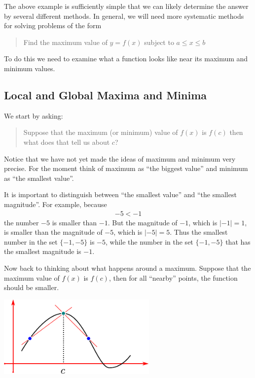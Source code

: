 The above example is sufficiently simple that we can likely determine the answer by
several different methods. In general, we will need more systematic methods for solving
problems of the form
\begin{quote}
 Find the maximum value of $y = f(x)$ subject to $a \leq x \leq b$
\end{quote}
To do this we need to examine what a function looks like near its
maximum and minimum values.

\subsection{Local and Global Maxima and Minima}\label{ssec maxmin}
We start by asking:
\begin{quote}
Suppose that the maximum (or minimum) value of $f(x)$ is $f(c)$ then what does that tell
us about $c$?
\end{quote}
Notice that we have not yet made the ideas of maximum and minimum very precise.
For the moment think of maximum as ``the biggest value'' and minimum as
``the smallest value''.

\begin{warning}
It is important to distinguish between ``the smallest value'' and ``the smallest
magnitude''. For example, because
\begin{align*}
  -5 < -1
\end{align*}
the number $-5$ is smaller than $-1$. But the magnitude of $-1$, which is $|-1|=1$, is
smaller than the magnitude of $-5$, which is $|-5|=5$. Thus the smallest number in the set
$\{-1, -5\}$ is $-5$, while the number in the set $\{-1,-5\}$ that has the smallest
magnitude is $-1$.
\end{warning}

Now back to thinking about what happens around a maximum. Suppose that the maximum value
of $f(x)$ is $f(c)$, then for all ``nearby'' points, the function should be smaller.
\begin{efig}
 \begin{center}
  \includegraphics[height=4cm]{extra/loc_max}
 \end{center}
\end{efig}

